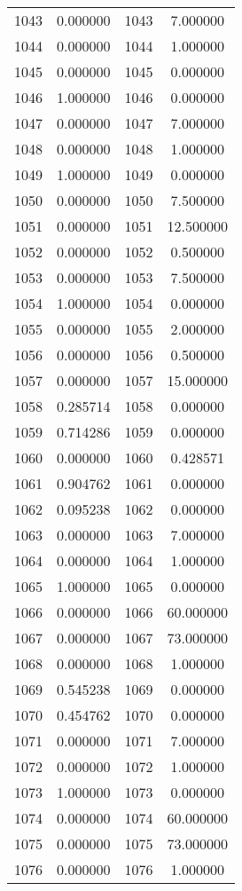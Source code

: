 \documentclass[12pt]{article}
\begin{document}
\begin{longtable}{@{}cccc@{}}
1043 & 0.000000 & 1043 & 7.000000 \\
1044 & 0.000000 & 1044 & 1.000000 \\
1045 & 0.000000 & 1045 & 0.000000 \\
1046 & 1.000000 & 1046 & 0.000000 \\
1047 & 0.000000 & 1047 & 7.000000 \\
1048 & 0.000000 & 1048 & 1.000000 \\
1049 & 1.000000 & 1049 & 0.000000 \\
1050 & 0.000000 & 1050 & 7.500000 \\
1051 & 0.000000 & 1051 & 12.500000 \\
1052 & 0.000000 & 1052 & 0.500000 \\
1053 & 0.000000 & 1053 & 7.500000 \\
1054 & 1.000000 & 1054 & 0.000000 \\
1055 & 0.000000 & 1055 & 2.000000 \\
1056 & 0.000000 & 1056 & 0.500000 \\
1057 & 0.000000 & 1057 & 15.000000 \\
1058 & 0.285714 & 1058 & 0.000000 \\
1059 & 0.714286 & 1059 & 0.000000 \\
1060 & 0.000000 & 1060 & 0.428571 \\
1061 & 0.904762 & 1061 & 0.000000 \\
1062 & 0.095238 & 1062 & 0.000000 \\
1063 & 0.000000 & 1063 & 7.000000 \\
1064 & 0.000000 & 1064 & 1.000000 \\
1065 & 1.000000 & 1065 & 0.000000 \\
1066 & 0.000000 & 1066 & 60.000000 \\
1067 & 0.000000 & 1067 & 73.000000 \\
1068 & 0.000000 & 1068 & 1.000000 \\
1069 & 0.545238 & 1069 & 0.000000 \\
1070 & 0.454762 & 1070 & 0.000000 \\
1071 & 0.000000 & 1071 & 7.000000 \\
1072 & 0.000000 & 1072 & 1.000000 \\
1073 & 1.000000 & 1073 & 0.000000 \\
1074 & 0.000000 & 1074 & 60.000000 \\
1075 & 0.000000 & 1075 & 73.000000 \\
1076 & 0.000000 & 1076 & 1.000000 \\

\end{longtable}
\end{document}
